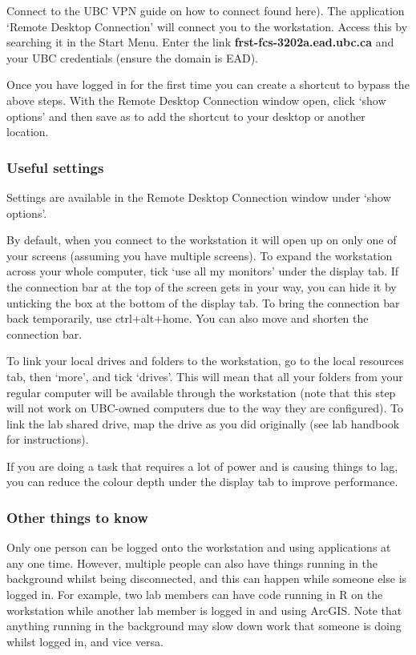 \documentclass[
]{book}
\begin{document}
Connect to the UBC VPN guide on how to connect found here). The application `Remote Desktop Connection' will connect you to the workstation. Access this by searching it in the Start Menu. Enter the link \textbf{frst-fcs-3202a.ead.ubc.ca} and your UBC credentials (ensure the domain is EAD).

Once you have logged in for the first time you can create a shortcut to bypass the above steps. With the Remote Desktop Connection window open, click `show options' and then save as to add the shortcut to your desktop or another location.

\hypertarget{useful-settings}{%
\subsubsection{Useful settings}\label{useful-settings}}

Settings are available in the Remote Desktop Connection window under `show options'.

By default, when you connect to the workstation it will open up on only one of your screens (assuming you have multiple screens). To expand the workstation across your whole computer, tick `use all my monitors' under the display tab. If the connection bar at the top of the screen gets in your way, you can hide it by unticking the box at the bottom of the display tab. To bring the connection bar back temporarily, use ctrl+alt+home. You can also move and shorten the connection bar.

To link your local drives and folders to the workstation, go to the local resources tab, then `more', and tick `drives'. This will mean that all your folders from your regular computer will be available through the workstation (note that this step will not work on UBC-owned computers due to the way they are configured). To link the lab shared drive, map the drive as you did originally (see lab handbook for instructions).

If you are doing a task that requires a lot of power and is causing things to lag, you can reduce the colour depth under the display tab to improve performance.

\hypertarget{other-things-to-know}{%
\subsubsection{Other things to know}\label{other-things-to-know}}

Only one person can be logged onto the workstation and using applications at any one time. However, multiple people can also have things running in the background whilst being disconnected, and this can happen while someone else is logged in. For example, two lab members can have code running in R on the workstation while another lab member is logged in and using ArcGIS. Note that anything running in the background may slow down work that someone is doing whilst logged in, and vice versa.
\end{document}
